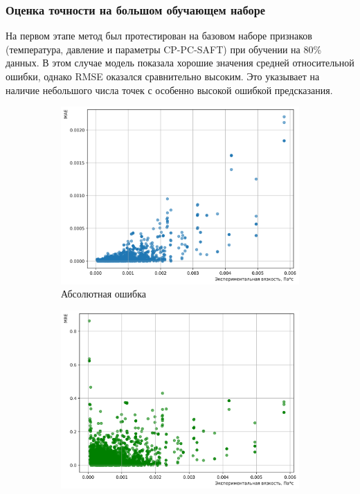 \documentclass[a4paper,12pt]{article}
\begin{document}
    \subsubsection{Оценка точности на большом обучающем наборе}

      На первом этапе метод был протестирован на базовом наборе признаков (температура, давление и параметры CP-PC-SAFT) при обучении на 80\% данных. В этом случае модель показала хорошие значения средней относительной ошибки, однако RMSE оказался сравнительно высоким. Это указывает на наличие небольшого числа точек с особенно высокой ошибкой предсказания.
      
      \begin{figure}[ht!]
        \centering
        \begin{subfigure}{0.48\textwidth}
            \centering
            \includegraphics[width=\linewidth]{knn/MAE_KNN (k=3)_0.2_base.png}
            \caption{Абсолютная ошибка}
        \end{subfigure}
        \hfill
        \begin{subfigure}{0.48\textwidth}
            \centering
            \includegraphics[width=\linewidth]{knn/MRE_KNN (k=3)_0.2_base.png}

\end{subfigure}
\end{figure}
\end{document}

